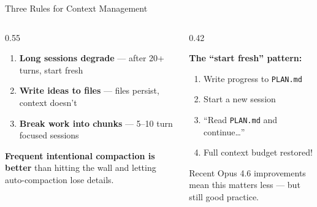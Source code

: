 \documentclass[aspectratio=169, 10pt]{beamer}
\begin{document}
\begin{frame}{Three Rules for Context Management}
\begin{columns}[T]
\begin{column}{0.55\textwidth}
\vskip2pt
\begin{enumerate}\setlength{\itemsep}{6pt}
  \item[\color{SlateTeal}\textbf{1.}] \textbf{Long sessions degrade} --- after 20+ turns, start fresh
  \pause
  \item[\color{SlateTeal}\textbf{2.}] \textbf{Write ideas to files} --- files persist, context doesn't
  \pause
  \item[\color{SlateTeal}\textbf{3.}] \textbf{Break work into chunks} --- 5--10 turn focused sessions
\end{enumerate}
\vskip8pt
\begin{tcolorbox}[quotebox]
\scriptsize \textbf{Frequent intentional compaction is better} than hitting the wall and letting auto-compaction lose details.
\end{tcolorbox}
\end{column}
\begin{column}{0.42\textwidth}
\vskip2pt
\begin{tcolorbox}[accentbox]
\scriptsize
\textbf{The ``start fresh'' pattern:}
\vskip2pt
\begin{enumerate}\setlength{\itemsep}{0pt}\tiny
  \item Write progress to \texttt{PLAN.md}
  \item Start a new session
  \item ``Read \texttt{PLAN.md} and continue\ldots''
  \item Full context budget restored!
\end{enumerate}
\end{tcolorbox}
\vskip4pt
{\tiny\color{CoolGray} Recent Opus 4.6 improvements mean this matters less --- but still good practice.}
\end{column}
\end{columns}
\end{frame}
\end{document}
